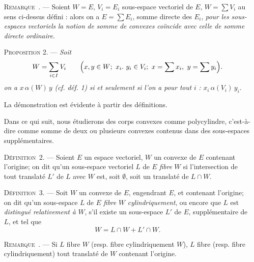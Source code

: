 \documentclass[11pt]{article}
\newcommand{\bzcf}[2]{#1}
\newcommand{\bznum}[1]{\if\relax\detokenize{#1}\relax\else\ #1\fi}
\newenvironment{defin}[1][]{\par\medskip\noindent\textsc{Définition\bznum{#1}.} --- }{\par\medskip}
\newenvironment{prop}[1][]{\par\medskip\noindent\textsc{Proposition #1.} --- \itshape}{\par\medskip}
\newenvironment{remarque}[1][]{\par\medskip\noindent\textsc{Remarque\bznum{#1}.} --- }{\par\medskip}
\newenvironment{proof}[1][]{\par}{\par}
\begin{document}
\begin{remarque}
Soient $W=E$, $V_i=E_i$ sous-espace vectoriel de $E$, $W=\sum V_i$ au sens ci-dessus défini :
alors on a $E=\sum E_i$, somme directe des $E_i$, \textit{pour les sous-espaces vectoriels la
notion de somme de convexes coïncide avec celle de somme directe ordinaire}.
\end{remarque}

\begin{prop}[2]
Soit
\[ W=\sum_{i\in I}V_i\qquad\Bigl(x, y\in W;\ x_i.\ y_i\in V_i;\ x=\sum x_i,\ y=\sum y_i\Bigr). \]
on a $x\,\alpha(W)\,y$ (\bzcf{\textit{cf.} déf. 1}{\ref{bzdef:c3s1d1_preordre_alpha}}) si et
seulement si l'on a pour tout $i$ : $x_i\,\alpha(V_i)\,y_i$.
\end{prop}

\begin{proof}
La démonstration est évidente à partir des définitions.
\end{proof}

Dans ce qui suit, nous étudierons des corps convexes comme polycylindre, c'est-à-dire comme somme
de deux ou plusieurs convexes contenus dans des sous-espaces supplémentaires.

\begin{defin}[2]
Soient $E$ un espace vectoriel, $W$ un convexe de $E$ contenant l'origine; on dit qu'un
sous-espace vectoriel $L$ de $E$ \textit{fibre} $W$ si l'intersection de tout translaté $L'$ de
$L$ avec $W$ est, soit $\emptyset$, soit un translaté de $L\cap W$.
\end{defin}

\begin{defin}[3]
Soit $W$ un convexe de $E$, engendrant $E$, et contenant l'origine; on dit qu'un sous-espace $L$
de $E$ \textit{fibre $W$ cylindriquement}, ou encore que $L$ est \textit{distingué relativement
à $W$}, s'il existe un sous-espace $L'$ de $E$, supplémentaire de $L$, et tel que
\[ W=L\cap W+L'\cap W. \]
\end{defin}

\begin{remarque}
Si $L$ fibre $W$ (resp. fibre cylindriquement $W$), $L$ fibre (resp. fibre cylindriquement) tout
translaté de $W$ contenant l'origine.
\end{remarque}
\end{document}
